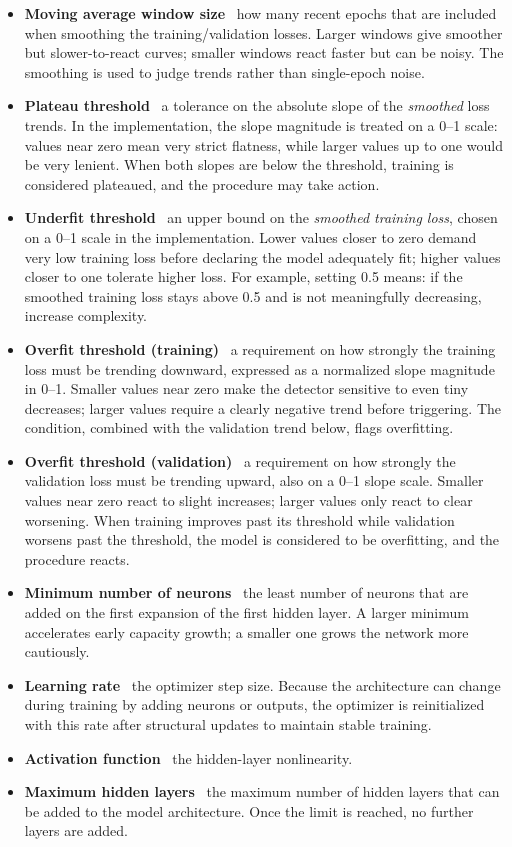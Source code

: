 \documentclass[conference]{IEEEtran}
\begin{document}
\begin{itemize}
\item \textbf{Moving average window size} \textemdash\ how many recent epochs that are included when smoothing the training/validation losses. Larger windows give smoother but slower-to-react curves; smaller windows react faster but can be noisy. The smoothing is used to judge trends rather than single-epoch noise.
\item \textbf{Plateau threshold} \textemdash\ a tolerance on the absolute slope of the \emph{smoothed} loss trends. In the implementation, the slope magnitude is treated on a 0--1 scale: values near zero mean very strict flatness, while larger values up to one would be very lenient. When both slopes are below the threshold, training is considered plateaued, and the procedure may take action.
\item \textbf{Underfit threshold} \textemdash\ an upper bound on the \emph{smoothed training loss}, chosen on a 0--1 scale in the implementation. Lower values closer to zero demand very low training loss before declaring the model adequately fit; higher values closer to one tolerate higher loss. For example, setting 0.5 means: if the smoothed training loss stays above 0.5 and is not meaningfully decreasing, increase complexity.
\item \textbf{Overfit threshold (training)} \textemdash\ a requirement on how strongly the training loss must be trending downward, expressed as a normalized slope magnitude in 0--1. Smaller values near zero make the detector sensitive to even tiny decreases; larger values require a clearly negative trend before triggering. The condition, combined with the validation trend below, flags overfitting.
\item \textbf{Overfit threshold (validation)} \textemdash\ a requirement on how strongly the validation loss must be trending upward, also on a 0--1 slope scale. Smaller values near zero react to slight increases; larger values only react to clear worsening. When training improves past its threshold while validation worsens past the threshold, the model is considered to be overfitting, and the procedure reacts.
\item \textbf{Minimum number of neurons} \textemdash\ the least number of neurons that are added on the first expansion of the first hidden layer. A larger minimum accelerates early capacity growth; a smaller one grows the network more cautiously.
\item \textbf{Learning rate} \textemdash\ the optimizer step size. Because the architecture can change during training by adding neurons or outputs, the optimizer is reinitialized with this rate after structural updates to maintain stable training.
\item \textbf{Activation function} \textemdash\ the hidden-layer nonlinearity.
\item \textbf{Maximum hidden layers} \textemdash\ the maximum number of hidden layers that can be added to the model architecture. Once the limit is reached, no further layers are added.
\end{itemize}
\end{document}
